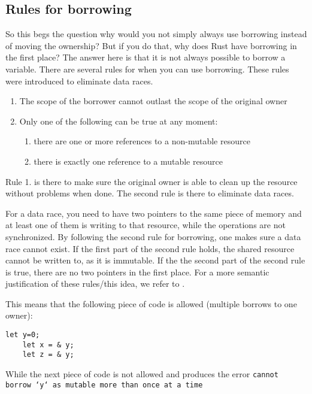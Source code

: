\subsection{Rules for borrowing}
So this begs the question why would you not simply always use borrowing instead of moving the ownership? But if you do that, why does Rust have borrowing in the first place? The answer here is that it is not always possible to borrow a variable. There are several rules for when you can use borrowing. These rules were introduced to eliminate data races. 
\begin{enumerate}[noitemsep]
    \item The scope of the borrower cannot outlast the scope of the original owner
\item Only one of the following can be true at any moment:
    \begin{enumerate}[noitemsep]
        \item there are one or more references to a non-mutable resource
        \item there is exactly one reference to a mutable resource
    \end{enumerate}
\end{enumerate}

Rule 1. is there to make sure the original owner is able to clean up the resource without problems when done. The second rule is there to eliminate data races. 

For a data race, you need to have two pointers to the same piece of memory and at least one of them is writing to that resource, while the operations are not synchronized. By following the second rule for borrowing, one makes sure a data race cannot exist. If the first part of the second rule holds, the shared resource cannot be written to, as it is immutable. If the the second part of the second rule is true, there are no two pointers in the first place. For a more semantic justification of these rules/this idea, we refer to \cite{boyland2003checking}.

This means that the following piece of code is allowed (multiple borrows to one owner):

\begin{verbatim}
let y=0;
	let x = & y; 
	let z = & y;
\end{verbatim}

While the next piece of code is not allowed and produces the error \texttt{cannot borrow `y` as mutable more than once at a time}


